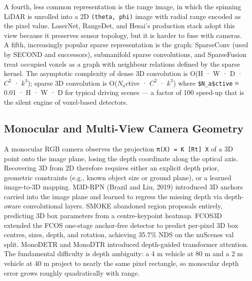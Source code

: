 \documentclass{article}
\begin{document}
A fourth, less common representation is the range image, in which the spinning LiDAR is unrolled into a 2D \texttt{(theta,\ phi)} image with radial range encoded as the pixel value. LaserNet, RangeDet, and Hesai's production stack adopt this view because it preserves sensor topology, but it is harder to fuse with cameras. A fifth, increasingly popular sparse representation is the graph: SparseConv (used by SECOND and successors), submanifold sparse convolutions, and SparseFusion \citep{xie2023sparsefusionfusing} treat occupied voxels as a graph with neighbour relations defined by the sparse kernel. The asymptotic complexity of dense 3D convolution is O(H · W · D · \(C^2\) · \(k^3\)); sparse 3D convolution is O(\(N_a\)ctive · \(C^2\) · \(k^3\)) where \texttt{\$N\_a\$ctive} ≈ 0.01 · H · W · D for typical driving scenes --- a factor of 100 speed-up that is the silent engine of voxel-based detectors.

\subsection{Monocular and Multi-View Camera Geometry}\label{monocular-and-multi-view-camera-geometry}

A monocular RGB camera observes the projection \texttt{π(X)\ =\ K\ {[}R\textbar{}t{]}\ X} of a 3D point onto the image plane, losing the depth coordinate along the optical axis. Recovering 3D from 2D therefore requires either an explicit depth prior, geometric constraints (e.g., known object size or ground plane), or a learned image-to-3D mapping. M3D-RPN (Brazil and Liu, 2019) introduced 3D anchors carried into the image plane and learned to regress the missing depth via depth-aware convolutional layers. SMOKE \citep{liu2020tanetrobust3dobjec} abandoned region proposals entirely, predicting 3D box parameters from a centre-keypoint heatmap. FCOS3D \citep{wang2021fcos3dfullyconvolu} extended the FCOS one-stage anchor-free detector to predict per-pixel 3D box centres, sizes, depth, and rotation, achieving 35.7\% NDS on the nuScenes val split. MonoDETR \citep{zhang2022monodetrdepthguide} and MonoDTR \citep{huang2022monodtrmonocular3d} introduced depth-guided transformer attention. The fundamental difficulty is depth ambiguity: a 4 m vehicle at 80 m and a 2 m vehicle at 40 m project to nearly the same pixel rectangle, so monocular depth error grows roughly quadratically with range.
\end{document}

